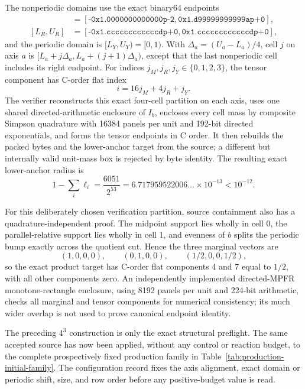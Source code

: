 \documentclass[aps,physrev,onecolumn,amsmath,amssymb,longbibliography]{revtex4-2}
\begin{document}
The nonperiodic domains use the exact binary64 endpoints
\begin{align}
 [L_M,U_M]&=
 [\texttt{-0x1.0000000000000p-2},
   \texttt{0x1.d99999999999ap+0}],\nonumber\\
 [L_R,U_R]&=
 [\texttt{-0x1.ccccccccccccdp+0},
   \texttt{0x1.ccccccccccccdp+0}],
 \label{eq:tiny-verification-domains}
\end{align}
and the periodic domain is $[L_Y,U_Y)=[0,1)$.  With
$\Delta_a=(U_a-L_a)/4$, cell $j$ on axis $a$ is
$[L_a+j\Delta_a,L_a+(j+1)\Delta_a)$, except that the last nonperiodic
cell includes its right endpoint.  For indices $j_M,j_R,j_Y\in\{0,1,2,3\}$,
the tensor component has C-order flat index
\begin{equation}
 i=16j_M+4j_R+j_Y.
 \label{eq:tiny-c-order-index}
\end{equation}
The verifier reconstructs this exact four-cell partition on each axis,
uses one shared directed-arithmetic enclosure of $I_b$, encloses every cell
mass by composite Simpson quadrature with 16384 panels per unit and 192-bit
directed exponentials, and forms the tensor endpoints in C order.  It then
rebuilds the packed bytes and the lower-anchor target from the source; a
different but internally valid unit-mass box is rejected by byte identity.
The resulting exact lower-anchor radius is
\begin{equation}
 1-\sum_i\ell_i=\frac{6051}{2^{53}}
 =6.717959522006\ldots\times10^{-13}<10^{-12}.
 \label{eq:tiny-initial-radius}
\end{equation}

For this deliberately chosen verification partition, source containment also
has a quadrature-independent proof.  The midpoint support lies wholly in cell
0, the parallel-relative support lies wholly in cell 1, and evenness of
$b$ splits the periodic bump exactly across the quotient cut.  Hence the
three marginal vectors are
\begin{equation}
 (1,0,0,0),\qquad (0,1,0,0),\qquad
 (1/2,0,0,1/2),
 \label{eq:tiny-structural-witness}
\end{equation}
so the exact product target has C-order flat components 4 and 7 equal to
$1/2$, with all other components zero.  An independently implemented
directed-MPFR monotone-rectangle enclosure, using 8192 panels per unit and
224-bit arithmetic, checks all marginal and tensor components for numerical
consistency; its much wider overlap is not used to prove canonical endpoint
identity.

The preceding $4^3$ construction is only the exact structural preflight.  The
same accepted source has now been applied, without any control or reaction
budget, to the complete prospectively fixed production family in
Table~\ref{tab:production-initial-family}.  The configuration record fixes the
axis alignment, exact domain or periodic shift, size, and row order before any
positive-budget value is read.
\end{document}
